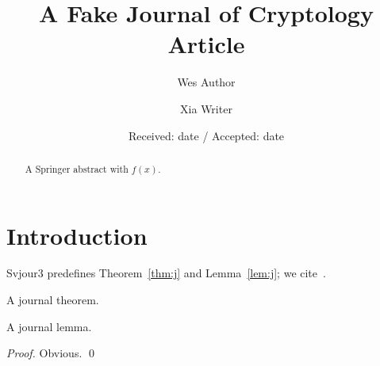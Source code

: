 \documentclass[smallextended]{svjour3}
\begin{document}
\title{A Fake Journal of Cryptology Article}
\author{Wes Author \and Xia Writer}
\date{Received: date / Accepted: date}
\maketitle
\begin{abstract}
A Springer abstract with $f(x)$.
\end{abstract}
\section{Introduction}\label{sec:intro}
Svjour3 predefines Theorem~\ref{thm:j} and Lemma~\ref{lem:j}; we cite~\cite{JocA}.
\begin{theorem}\label{thm:j}
A journal theorem.
\end{theorem}
\begin{lemma}\label{lem:j}
A journal lemma.
\end{lemma}
\begin{proof}
Obvious. \qed
\end{proof}


\end{document}
